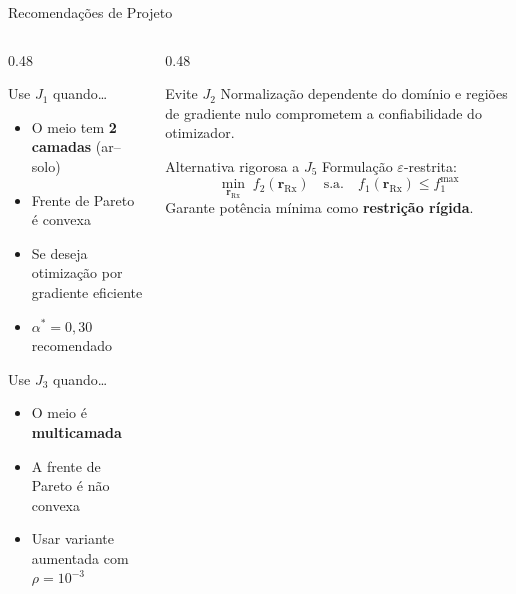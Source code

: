 \documentclass[aspectratio=169, 10pt]{beamer}
\newcommand{\Rx}{\mathrm{Rx}}
\newcommand{\rRx}{\mathbf{r}_{\Rx}}
\begin{document}
\begin{frame}{Recomendações de Projeto}
  \begin{columns}[T]
    \begin{column}{0.48\textwidth}
      \begin{block}{Use $J_1$ quando\ldots}
        \begin{itemize}
          \item O meio tem \textbf{2 camadas} (ar--solo)
          \item Frente de Pareto é convexa
          \item Se deseja otimização por gradiente eficiente
          \item[$\to$] $\alpha^* = 0{,}30$ recomendado
        \end{itemize}
      \end{block}
      \vspace{0.5em}
      \begin{block}{Use $J_3$ quando\ldots}
        \begin{itemize}
          \item O meio é \textbf{multicamada}
          \item A frente de Pareto é não convexa
          \item Usar variante aumentada com $\rho = 10^{-3}$
        \end{itemize}
      \end{block}
    \end{column}
    \begin{column}{0.48\textwidth}
      \begin{alertblock}{Evite $J_2$}
        Normalização dependente do domínio e regiões de gradiente nulo
        comprometem a confiabilidade do otimizador.
      \end{alertblock}
      \vspace{0.5em}
      \begin{block}{Alternativa rigorosa a $J_5$}
        Formulação $\varepsilon$-restrita:
        \begin{equation*}
          \min_{\rRx}\;f_2(\rRx)\quad
          \text{s.a.}\quad f_1(\rRx) \leq f_1^{\max}
        \end{equation*}
        Garante potência mínima como \textbf{restrição rígida}.
      \end{block}
    \end{column}
  \end{columns}
\end{frame}
\end{document}
